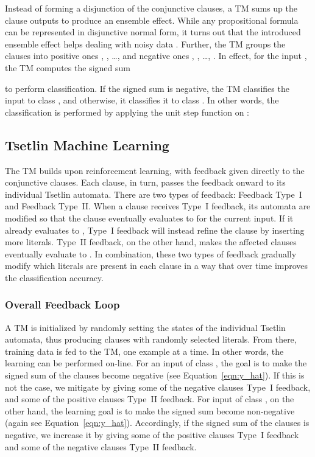 \documentclass[letterpaper]{article}
\begin{document}
Instead of forming a disjunction of the conjunctive clauses, a TM sums up the clause outputs to produce an ensemble effect. While any propositional formula can be represented in disjunctive normal form, it turns out that the introduced ensemble effect helps dealing with noisy data \cite{granmo2018tsetlin}. Further, the TM groups the clauses into positive ones , , \ldots,  and negative ones , , \ldots, . In effect, for the input , the TM computes the signed sum

to perform classification. If the signed sum is negative, the TM classifies the input to class , and otherwise, it classifies it to class . In other words, the classification is performed by applying the unit step function on :


\subsection{Tsetlin Machine Learning}
The TM builds upon reinforcement learning, with feedback given directly to the conjunctive clauses. Each clause, in turn, passes the feedback onward to its individual Tsetlin automata. There are two types of feedback: Feedback Type~I and Feedback Type~II. When a clause receives Type~I feedback, its automata are modified so that the clause eventually evaluates to  for the current input. If it already evaluates to , Type~I feedback will instead refine the clause by inserting more literals. Type~II feedback, on the other hand, makes the affected clauses eventually evaluate to . In combination, these two types of feedback gradually modify which literals are present in each clause in a way that over time improves the classification accuracy.

\subsubsection{Overall Feedback Loop}
A TM is initialized by randomly setting the states of the individual Tsetlin automata, thus producing clauses with randomly selected literals. From there, training data is fed to the TM, one example  at a time. In other words, the learning can be performed on-line. For an input  of class , the goal is to make the signed sum  of the clauses become negative (see Equation~\ref{eqn:y_hat}). If this is not the case, we mitigate by giving some of the negative clauses Type~I feedback, and some of the positive clauses Type~II feedback. For input  of class , on the other hand, the learning goal is to make the signed sum  become non-negative (again see Equation~\ref{eqn:y_hat}). Accordingly, if the signed sum of the clauses is negative, we increase it by giving some of the positive clauses Type~I feedback and some of the negative clauses Type~II feedback.
\end{document}
